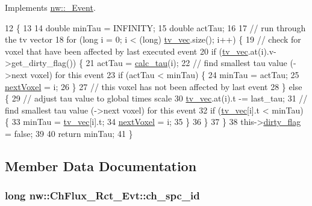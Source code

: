 Implements \hyperlink{classnw_1_1___event_a882115f8652c881bc8ed43f1050ccba3}{nw\+::\+\_\+\+Event}.


\begin{DoxyCode}
12                                             \{
13 
14     \textcolor{keywordtype}{double} minTau = INFINITY;
15     \textcolor{keywordtype}{double} actTau;
16 
17 \textcolor{comment}{//  run through the tv vector}
18     \textcolor{keywordflow}{for} (\textcolor{keywordtype}{long} i = 0; i < (long) \hyperlink{classnw_1_1___event_a6351b58d94923ed58e0b2cf6c9445d2e}{tv\_vec}.size(); i++) \{
19 \textcolor{comment}{//      check for voxel that have been affected by last executed event}
20         \textcolor{keywordflow}{if} (\hyperlink{classnw_1_1___event_a6351b58d94923ed58e0b2cf6c9445d2e}{tv\_vec}.at(i).v->get\_dirty\_flag()) \{
21             actTau = \hyperlink{classnw_1_1_ch_flux___rct___evt_a929abfad936dfc3501b8b5b523112ab9}{calc\_tau}(i);
22 \textcolor{comment}{//          find smallest tau value (->next voxel) for this event}
23             \textcolor{keywordflow}{if} (actTau < minTau) \{
24                 minTau = actTau;
25                 \hyperlink{classnw_1_1___event_a7864559e204c087306e3becb5b81fb26}{nextVoxel} = i;
26             \}
27 \textcolor{comment}{//      this voxel has not been affected by last event}
28         \} \textcolor{keywordflow}{else} \{
29 \textcolor{comment}{//          adjust tau value to global times scale}
30             \hyperlink{classnw_1_1___event_a6351b58d94923ed58e0b2cf6c9445d2e}{tv\_vec}.at(i).t -= last\_tau;
31 \textcolor{comment}{//          find smallest tau value (->next voxel) for this event}
32             \textcolor{keywordflow}{if} (\hyperlink{classnw_1_1___event_a6351b58d94923ed58e0b2cf6c9445d2e}{tv\_vec}[i].t < minTau) \{
33                 minTau = \hyperlink{classnw_1_1___event_a6351b58d94923ed58e0b2cf6c9445d2e}{tv\_vec}[i].t;
34                 \hyperlink{classnw_1_1___event_a7864559e204c087306e3becb5b81fb26}{nextVoxel} = i;
35             \}
36         \}
37     \}
38     this->\hyperlink{classnw_1_1___event_aaa705b35c06c0cb2e0a4f3daa9ee8037}{dirty\_flag} = \textcolor{keyword}{false};
39 
40     \textcolor{keywordflow}{return} minTau;
41 \}
\end{DoxyCode}


\subsection{Member Data Documentation}
\hypertarget{classnw_1_1_ch_flux___rct___evt_a29702aefc95f39082b9d8a9278e3b0f8}{
\subsubsection[{ch\+\_\+spc\+\_\+id}]{\setlength{\rightskip}{0pt plus 5cm}long nw\+::\+Ch\+Flux\+\_\+\+Rct\+\_\+\+Evt\+::ch\+\_\+spc\+\_\+id\hspace{0.3cm}{\ttfamily [private]}}}\label{classnw_1_1_ch_flux___rct___evt_a29702aefc95f39082b9d8a9278e3b0f8}


